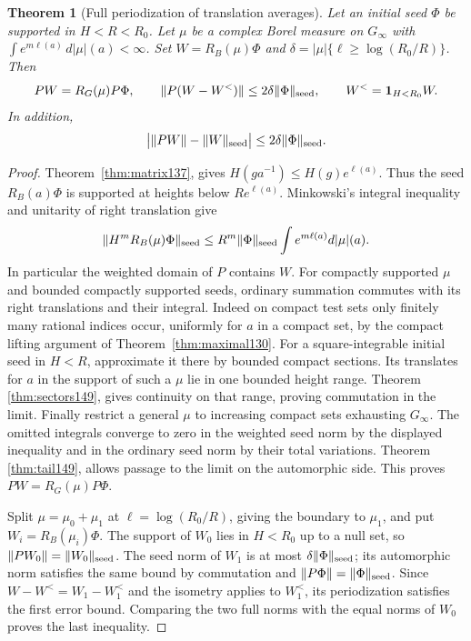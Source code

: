 \documentclass[a4paper,11pt]{article}
\newtheorem{theorem}[proposition]{Theorem}
\theoremstyle{definition}
\theoremstyle{remark}
\numberwithin{equation}{section}
\begin{document}
\begin{theorem}[Full periodization of translation averages]
\label{thm:smooth150}
Let an initial seed \(\Phi\) be supported in \(H<R<R_0\).
Let \(\mu\) be a complex Borel measure on \(G_\infty\) with
\(\int e^{m\ell(a)}\,d|\mu|(a)<\infty\).
Set \(W=R_B(\mu)\Phi\) and
\(\delta=|\mu|\{\ell\ge\log(R_0/R)\}\). Then
\[
         P W=R_G(\mu)P\Phi,\qquad
         \|P(W-W^{<})\|\le2\delta\|\Phi\|_{\rm seed},
         \qquad W^{<}=\mathbf1_{H<R_0}W .
\]
In addition,
\[
          \big|\|P W\|-\|W\|_{\rm seed}\big|
                     \le 2\delta\|\Phi\|_{\rm seed}.
\]
\end{theorem}
\begin{proof}
Theorem~\ref{thm:matrix137}, gives
\(H(ga^{-1})\le H(g)e^{\ell(a)}\).
Thus the seed \(R_B(a)\Phi\) is supported at heights below
\(R e^{\ell(a)}\). Minkowski's integral inequality and
unitarity of right translation give
\[
   \|H^m R_B(\mu)\Phi\|_{\rm seed}
          \le R^m\|\Phi\|_{\rm seed}\int e^{m\ell(a)}d|\mu|(a).
\]
In particular the weighted domain of \(P\) contains \(W\).
For compactly supported \(\mu\) and bounded compactly
supported seeds, ordinary summation commutes with its right
translations and their integral. Indeed on compact test sets
only finitely many rational indices occur, uniformly for \(a\)
in a compact set, by the compact lifting argument of
Theorem~\ref{thm:maximal130}. For a square-integrable initial
seed in \(H<R\), approximate it there by bounded compact
sections. Its translates for \(a\) in the support of such a
\(\mu\) lie in one bounded height range. Theorem \ref{thm:sectors149},
gives continuity on that range, proving commutation in the
limit. Finally restrict a general \(\mu\) to increasing compact
sets exhausting \(G_\infty\). The omitted integrals converge
to zero in the weighted seed norm by the displayed inequality
and in the ordinary seed norm by their total variations.
Theorem \ref{thm:tail149}, allows passage to the limit on the
automorphic side. This proves \(PW=R_G(\mu)P\Phi\).

Split \(\mu=\mu_0+\mu_1\) at
\(\ell=\log(R_0/R)\), giving the boundary to \(\mu_1\), and
put \(W_i=R_B(\mu_i)\Phi\). The support of \(W_0\) lies in
\(H<R_0\) up to a null set, so \(\|PW_0\|=\|W_0\|_{\rm seed}\).
The seed norm of \(W_1\) is at most
\(\delta\|\Phi\|_{\rm seed}\); its automorphic norm satisfies
the same bound by commutation and \(\|P\Phi\|=\|\Phi\|_{\rm seed}\).
Since \(W-W^{<}=W_1-W_1^{<}\) and the isometry applies to
\(W_1^{<}\), its periodization satisfies the first error bound.
Comparing the two full norms with the equal norms of \(W_0\)
proves the last inequality.
\end{proof}
\end{document}
